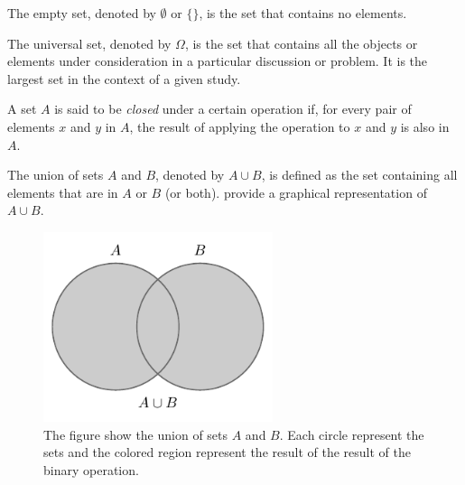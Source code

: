 \begin{definition}
	The empty set, denoted by $\emptyset$ or $\{\}$, is the set that contains no elements.
\end{definition}

\begin{definition}
	The universal set, denoted by $\Omega$, is the set that contains all the objects or elements under consideration in a particular discussion or problem. It is the largest set in the context of a given study.
\end{definition}

\begin{definition}[Closure]
	A set $A$ is said to be \textit{closed} under a certain operation if, for every pair of elements $x$ and $y$ in $A$, the result of applying the operation to $x$ and $y$ is also in $A$.
\end{definition}

\begin{definition}[Union]
	The union of sets $A$ and $B$, denoted by $A \cup B$, is defined as the set containing all elements that are in $A$ or $B$ (or both).  provide a graphical representation of $A \cup B$.
	\begin{figure}[h]
		\centering
		\includegraphics[width = 0.6\textwidth]{figures/set_union.pdf}
		\caption{The figure show the union of sets $A$ and $B$. Each circle represent the sets and the colored region represent the result of the result of the binary operation.}
		\label{fig:set_union}
	\end{figure}
\end{definition}


